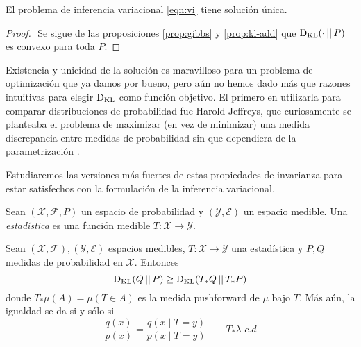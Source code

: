 \documentclass[main.tex]{subfiles}
\begin{document}
\begin{theorem}
El problema de inferencia variacional \eqref{eqn:vi} tiene solución única. 
\end{theorem}
\begin{proof} $ $ \newline
Se sigue de las proposiciones \ref{prop:gibbs} y \ref{prop:kl-add} que $\operatorname*{D_{KL}}(\cdot \operatorname*{\mid\mid} P)$ es convexo para toda $P$.
\end{proof}


Existencia y unicidad de la solución es maravilloso para un problema de optimización que ya damos por bueno, pero aún no hemos dado más que razones intuitivas para elegir $\operatorname*{D_{KL}}$ como función objetivo. El primero en utilizarla para comparar distribuciones de probabilidad fue Harold Jeffreys, que curiosamente se planteaba el problema de maximizar (en vez de minimizar) una medida discrepancia entre medidas de probabilidad sin que dependiera de la parametrización \cite{jeffreys1946}. 

Estudiaremos las versiones más fuertes de estas propiedades de invarianza para estar satisfechos con la formulación de la inferencia variacional. 

\begin{definition}
	Sean $(\mathcal{X}, \mathcal{F}, P)$ un espacio de probabilidad y $(\mathcal{Y}, \mathcal{E})$ un espacio medible. Una \textit{estadística} es una función medible $T:\mathcal{X} \to \mathcal{Y}$.
\end{definition}


\begin{theorem}
	Sean $(\mathcal{X}, \mathcal{F}), (\mathcal{Y}, \mathcal{E})$ espacios medibles, $T: \mathcal{X} \to \mathcal{Y}$ una estadística y $P, Q$ medidas de probabilidad en $\mathcal{X}$. Entonces
	\begin{equation}\label{eq:info-pr}
		\operatorname*{D_{KL}}(Q \operatorname*{\mid\mid} P) \geq \operatorname*{D_{KL}}(T_*Q \operatorname*{\mid\mid} T_*P)
	\end{equation}
	donde $T_*\mu(A)=\mu\left(T \in A\right)$ es la medida pushforward de $\mu$ bajo $T$. Más aún, la igualdad se da si y sólo si 
	\begin{equation}\label{eq:suf}
	\frac{q(x)}{p(x)}=
		\frac{q\left(x\mid T=y\right)}
			{p\left(x\mid T=y\right)}
		\qquad T_*\lambda\textit{-c.d}
	\end{equation}
\end{theorem}
\end{document}
